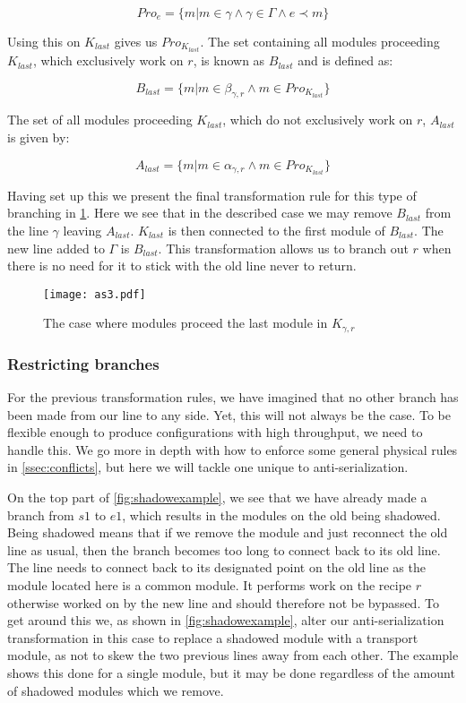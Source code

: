 \[Pro_{e} = \{m | m \in \gamma \land \gamma \in \Gamma \land e \prec  m \}\]

Using this on $K_{last}$ gives us $Pro_{K_{last}}$. The set containing all modules proceeding $K_{last}$, which exclusively work on $r$, is known as $B_{last}$ and is defined as:

\[B_{last} = \{m | m \in \beta_{\gamma ,r}  \land m \in Pro_{K_{last}} \}\]

The set of all modules proceeding $K_{last}$, which do not exclusively work on $r$, $A_{last}$ is given by:

\[ A_{last} = \{m | m \in \alpha_{\gamma ,r}  \land m \in Pro_{K_{last}} \} \]

Having set up this we present the final transformation rule for this type of branching in \cref{fig:asbranchout}. Here we see that in the described case we may remove $B_{last}$ from the line $\gamma$ leaving  $A_{last}$. $K_{last}$ is then connected to the first module of $B_{last}$. The new line added to $\Gamma$ is $B_{last}$. This transformation allows us to branch out $r$ when there is no need for it to stick with the old line never to return.

\begin{figure}[H]
\centering
\texttt{[image: as3.pdf]}
\caption{The case where modules proceed the last module in $K_{\gamma ,r}$}
\label{fig:asbranchout}
\end{figure}

\subsubsection{Restricting branches}
For the previous transformation rules, we have imagined that no other branch has been made from our line to any side. Yet, this will not always be the case. To be flexible enough to produce configurations with high throughput, we need to handle this. We go more in depth with how to enforce some general physical rules in \cref{ssec:conflicts}, but here we will tackle one unique to anti-serialization.

On the top part of \cref{fig:shadowexample}, we see that we have already made a branch from $s1$ to $e1$, which results in the modules on the old being shadowed. Being shadowed means that if we remove the module and just reconnect the old line as usual, then the branch becomes too long to connect back to its old line. The line needs to connect back to its designated point on the old line as the module located here is a common module. It performs work on the recipe $r$ otherwise worked on by the new line and should therefore not be bypassed.  To get around this we, as shown in \cref{fig:shadowexample}, alter our anti-serialization transformation in this case to replace a shadowed module with a transport module, as not to skew the two previous lines away from each other. The example shows this done for a single module, but it may be done regardless of the amount of shadowed modules which we remove.

